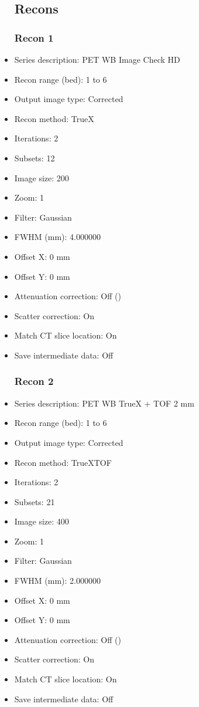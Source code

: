 \documentclass[12pt]{article}
\begin{document}
\begin{itemize}
\subsection{Recons}
\subsubsection{Recon 1}
\item Series description: PET WB Image Check HD
\item Recon range (bed): 1 to 6
\item Output image type: Corrected
\item Recon method: TrueX
\item Iterations: 2
\item Subsets: 12
\item Image size: 200
\item Zoom: 1
\item Filter: Gaussian
\item FWHM (mm): 4.000000
\item Offset X: 0 mm
\item Offset Y: 0 mm
\item Attenuation correction: Off ()
\item Scatter correction: On
\item Match CT slice location: On
\item Save intermediate data: Off
\subsubsection{Recon 2}
\item Series description: PET WB TrueX + TOF 2 mm
\item Recon range (bed): 1 to 6
\item Output image type: Corrected
\item Recon method: TrueXTOF
\item Iterations: 2
\item Subsets: 21
\item Image size: 400
\item Zoom: 1
\item Filter: Gaussian
\item FWHM (mm): 2.000000
\item Offset X: 0 mm
\item Offset Y: 0 mm
\item Attenuation correction: Off ()
\item Scatter correction: On
\item Match CT slice location: On
\item Save intermediate data: Off
\end{itemize}
\end{document}
